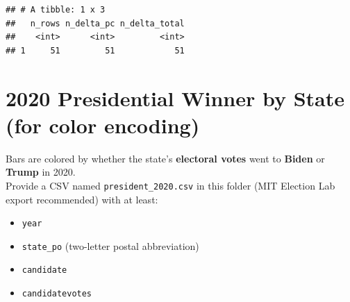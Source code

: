 \documentclass[
  11pt,
]{article}
\providecommand{\tightlist}{%
  \setlength{\itemsep}{0pt}\setlength{\parskip}{0pt}}
\begin{document}
\begin{verbatim}
## # A tibble: 1 x 3
##   n_rows n_delta_pc n_delta_total
##    <int>      <int>         <int>
## 1     51         51            51
\end{verbatim}

\section{2020 Presidential Winner by State (for color
encoding)}\label{presidential-winner-by-state-for-color-encoding}

Bars are colored by whether the state's \textbf{electoral votes} went to
\textbf{Biden} or \textbf{Trump} in 2020.\\
Provide a CSV named \texttt{president\_2020.csv} in this folder (MIT
Election Lab export recommended) with at least:

\begin{itemize}
\tightlist
\item
  \texttt{year}
\item
  \texttt{state\_po} (two-letter postal abbreviation)
\item
  \texttt{candidate}
\item
  \texttt{candidatevotes}
\end{itemize}
\end{document}
